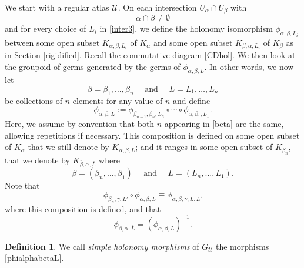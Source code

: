 \documentclass[JEP,XML,SOM,Unicode]{cedram}
\let\mathcal\mathscr
\theoremstyle{plain}
\theoremstyle{definition}
\newtheorem{definition}[theorem]{Definition}
\theoremstyle{remark}
\numberwithin{equation}{section}
\begin{document}
We start with a regular atlas $\mathcal U$. On each intersection $U_{\alpha}\cap U_{\beta}$ with
\begin{equation}
\label{inter3}
\alpha\cap\beta\not=\emptyset
\end{equation}
and for every choice of $L_i$ in \eqref{inter3}, we define the holonomy isomorphism $\phi_{\alpha,\beta, L_i}$ between some open subset $K_{\alpha, \beta, L_i}$ of $K_{\alpha}$ and some open subset $K_{\beta, \alpha, L_i}$ of $K_{\beta}$ as in Section \ref{rigidified}. Recall the commutative diagram \eqref{CDhol}.
We then look at the groupoid of germs generated by the germs of $\phi_{\alpha,\beta, L}$. In other words, we now let
\begin{equation}
\label{beta}
\beta=\beta_1,\hdots,\beta_n\quad\text{ and }\quad L=L_1,\hdots, L_n
\end{equation}
be collections of $n$ elements for any value of $n$ and define
\begin{equation}
\label{phialphabetaL}
\phi_{\alpha,\beta, L}:=\phi_{\beta_{n-1},\beta_n, L_n}\circ\cdots\circ \phi_{\alpha,\beta_1, L_1}.
\end{equation}
Here, we assume by convention that both $n$ appearing in \eqref{beta} are the same, allowing repetitions if necessary. This composition is defined on some open subset of $K_{\alpha}$ that we still denote by $K_{\alpha,\beta, L}$; and it ranges in some open subset of $K_{\beta_n}$, that we denote by $K_{\bar\beta, \alpha, \bar L}$ where
\begin{equation}
\label{barbeta}
\bar\beta=(\beta_n,\hdots,\beta_1)\quad\text{ and }\quad \bar L=(L_n,\hdots, L_1).
\end{equation}
Note that
\begin{equation}
\label{compatibility}
\phi_{\beta_n, \gamma, L'}\circ\phi_{\alpha, \beta, L}\equiv \phi_{\alpha, \beta,\gamma, L, L'}
\end{equation}
where this composition is defined, and that
\begin{equation}
\label{compatibility2}
\phi_{\bar\beta,\alpha, \bar L}=(\phi_{\alpha,\beta, L})^{-1}.
\end{equation}

\begin{definition}
\label{simplegerms}
We call \emph{simple holonomy morphisms} of $G_\mathcal U$ the morphisms \eqref{phialphabetaL}.
\end{definition}
\end{document}
